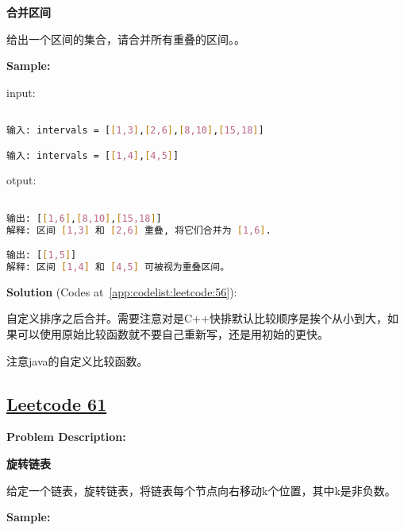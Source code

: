 \textbf{合并区间}\par

给出一个区间的集合，请合并所有重叠的区间。。\par


\textbf{Sample:}\par

input:\par

\begin{lstlisting}[language=bash]

输入: intervals = [[1,3],[2,6],[8,10],[15,18]]

输入: intervals = [[1,4],[4,5]]


\end{lstlisting}

otput:\par

\begin{lstlisting}[language=bash]

输出: [[1,6],[8,10],[15,18]]
解释: 区间 [1,3] 和 [2,6] 重叠, 将它们合并为 [1,6].

输出: [[1,5]]
解释: 区间 [1,4] 和 [4,5] 可被视为重叠区间。


\end{lstlisting}

\textbf{Solution }(Codes at~\ref{app:codelist:leetcode:56}):\par

自定义排序之后合并。需要注意对是C++快排默认比较顺序是挨个从小到大，如果可以使用原始比较函数就不要自己重新写，还是用初始的更快。\par

注意java的自定义比较函数。\par



\subsection{\href{https://leetcode-cn.com/}{Leetcode 61}}\label{app:problemlist:leetcode:61}

\textbf{Problem Description:}\par

\textbf{旋转链表}\par

给定一个链表，旋转链表，将链表每个节点向右移动k个位置，其中k是非负数。\par


\textbf{Sample:}\par

